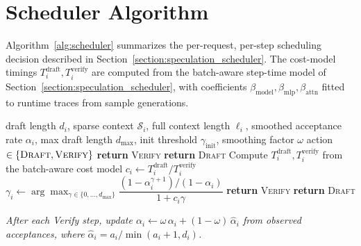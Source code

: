 \section{Scheduler Algorithm}
\label{appendix:scheduler}
Algorithm~\ref{alg:scheduler} summarizes the per-request, per-step scheduling decision described in Section~\ref{section:speculation_scheduler}. The cost-model timings $T_i^{\mathrm{draft}}, T_i^{\mathrm{verify}}$ are
computed from the batch-aware step-time model of
Section~\ref{section:speculation_scheduler}, with coefficients
$\beta_{\mathrm{model}}, \beta_{\mathrm{mlp}}, \beta_{\mathrm{attn}}$ fitted
to runtime traces from sample generations.

\begin{algorithm}[h]
\caption{Per-request, per-step scheduling decision in ASPIRE.}
\label{alg:scheduler}
\begin{algorithmic}[1]
\REQUIRE draft length $d_i$, sparse context $\mathcal{S}_i$, full context length $\ell_i$, smoothed acceptance rate $\alpha_i$, max draft length $d_{\max}$, init threshold $\gamma_{\mathrm{init}}$, smoothing factor $\omega$
\ENSURE action $\in \{\textsc{Draft}, \textsc{Verify}\}$
\STATE \textbf{return} \textsc{Verify}
\ENDIF
{}
\STATE \textbf{return} \textsc{Draft}
\ENDIF
\STATE Compute $T_i^{\mathrm{draft}}, T_i^{\mathrm{verify}}$ from the batch-aware cost model
\STATE $c_i \gets T_i^{\mathrm{draft}} / T_i^{\mathrm{verify}}$
\STATE $\gamma_i \gets \arg\max_{\gamma \in \{0,\dots,d_{\max}\}} \dfrac{(1-\alpha_i^{\gamma+1})/(1-\alpha_i)}{1 + c_i \gamma}$
\STATE \textbf{return} \textsc{Verify}
\ELSE
\STATE \textbf{return} \textsc{Draft}
\ENDIF
\end{algorithmic}
\textit{After each Verify step, update $\alpha_i \gets \omega\,\alpha_i + (1-\omega)\,\hat{\alpha}_i$ from observed acceptances, where $\hat{\alpha}_i = a_i / \min(a_i+1, d_i)$.}
\end{algorithm}
